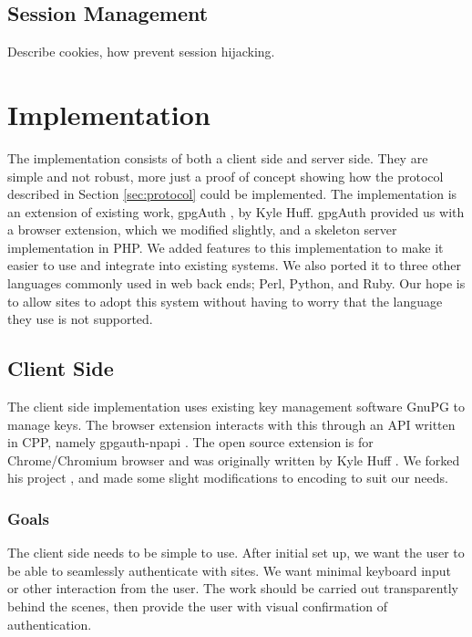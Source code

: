 \documentclass[11pt]{article}
\begin{document}
\subsection{Session Management} \label{sessionManagement}
Describe cookies, how prevent session hijacking.


\section{Implementation} \label{sec:implementation}
The implementation consists of both a client side and server side. They are simple and not robust, more just a proof of concept showing how the protocol described in Section \ref{sec:protocol} could be implemented. The implementation is an extension of existing work, gpgAuth \cite{gpgauth}, by Kyle Huff. gpgAuth provided us with a browser extension, which we modified slightly, and a skeleton server implementation in PHP. We added features to this implementation to make it easier to use and integrate into existing systems. We also ported it to three other languages commonly used in web back ends; Perl, Python, and Ruby. Our hope is to allow sites to adopt this system without having to worry that the language they use is not supported. 

\subsection{Client Side}
The client side implementation uses existing key management software GnuPG to manage keys. The browser extension interacts with this through an API written in CPP, namely gpgauth-npapi \cite{npapi}. The open source extension is for Chrome/Chromium browser and was originally written by Kyle Huff \cite{ext}. We forked his project \cite{extFork}, and made some slight modifications to encoding to suit our needs.  
\subsubsection{Goals}
The client side needs to be simple to use. After initial set up, we want the user to be able to seamlessly authenticate with sites. We want minimal keyboard input or other interaction from the user. The work should be carried out transparently behind the scenes, then provide the user with visual confirmation of authentication.
\end{document}
